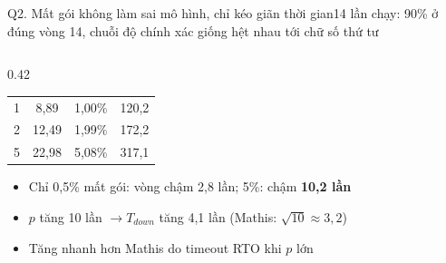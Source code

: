 \documentclass[aspectratio=169,10pt]{beamer}
\begin{document}
\begin{frame}{Q2. Mất gói không làm sai mô hình, chỉ kéo giãn thời gian}{14 lần chạy: 90\% ở đúng vòng 14, chuỗi độ chính xác giống hệt nhau tới chữ số thứ tư}
\begin{columns}[c]
\begin{column}{0.42\textwidth}
\begin{tabular}{c c c c}
        1 & 8,89 & 1,00\% & 120,2 \\
        2 & 12,49 & 1,99\% & 172,2 \\
        5 & 22,98 & 5,08\% & 317,1 \\
        \bottomrule
      \end{tabular}
      \vspace{4pt}
      \begin{itemize}\footnotesize
        \item Chỉ 0,5\% mất gói: vòng chậm 2,8 lần; 5\%: chậm \textbf{10,2 lần}
        \item $p$ tăng 10 lần $\to T_{down}$ tăng 4,1 lần (Mathis: $\sqrt{10} \approx 3{,}2$)
        \item Tăng nhanh hơn Mathis do timeout RTO khi $p$ lớn
      \end{itemize}
    \end{column}
  \end{columns}
\end{frame}
\end{document}
